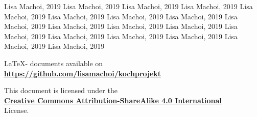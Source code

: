 \documentclass[10pt,a4paper]{article}
\begin{document}
\newpage
\renewcommand{\refname}{\textsc{References:}}
\begin{thebibliography}{9}
	 Lisa Machoi, 2019
	 Lisa Machoi, 2019
	 Lisa Machoi, 2019
	 Lisa Machoi, 2019
	 Lisa Machoi, 2019
	 Lisa Machoi, 2019
	 Lisa Machoi, 2019
	 Lisa Machoi, 2019
	 Lisa Machoi, 2019
	 Lisa Machoi, 2019
	 Lisa Machoi, 2019
	 Lisa Machoi, 2019
	 Lisa Machoi, 2019
	 Lisa Machoi, 2019
	 Lisa Machoi, 2019
	 Lisa Machoi, 2019
	 Lisa Machoi, 2019
	 Lisa Machoi, 2019
\end{thebibliography}
\vspace{2cm}
\begin{center}
	\LaTeX - documents available on\\ \href{https://github.com/lisamachoi/kochprojekt}{\textbf{https://github.com/lisamachoi/kochprojekt}}
	
	\vspace{2cm}
	
	This document is licensed under the\\ \href{https://creativecommons.org/licenses/by-sa/4.0/}{\textbf{Creative Commons Attribution-ShareAlike 4.0 International}}\\
	License.

	\vspace{1cm}

	{\huge\ccbysa}
\end{center}
\end{document}
